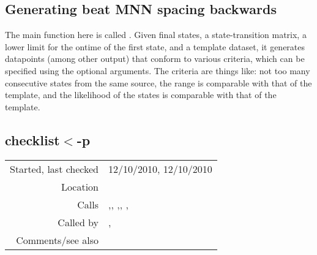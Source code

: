 \subsection{Generating beat MNN spacing backwards}\label{sec:generating-beat-MNN-spacing-backwards}

The main function here is called
. Given final states, a
state-transition matrix, a lower limit for the ontime
of the first state, and a template dataset, it
generates datapoints (among other output) that conform
to various criteria, which can be specified using the
optional arguments. The criteria are things like: not
too many consecutive states from the same source, the
range is comparable with that of the template, and the
likelihood of the states is comparable with that of
the template.


\subsection*{checklist$<$-p}\label{fun:checklist<-p}

\vspace{0.3cm}
\begin{tabular}{r|p{8cm}}
Started, last checked & 12/10/2010, 12/10/2010 \\
Location & \nameref{sec:generating-beat-MNN-spacing-backwards} \\
Calls & \nameref{fun:comparable-likelihood-profile<-p},\newline \nameref{fun:index-item-1st-doesnt-occur}, \nameref{fun:lastn},\newline \nameref{fun:mean-and-rangep}, \nameref{fun:pitch-and-octave-spellingp},\newline \nameref{fun:segments-strict} \\
Called by & \nameref{fun:generate-beat-MNN-spacing<-},\newline \nameref{fun:generate-beat-spacing-forcing<-} \\
Comments/see also & \nameref{fun:checklistp}
\end{tabular}

